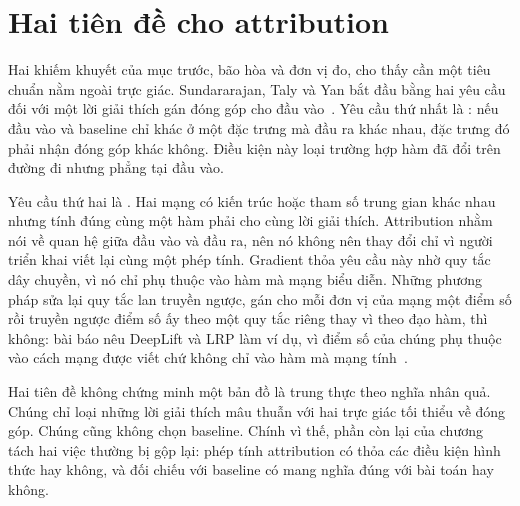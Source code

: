 \section{Hai tiên đề cho attribution}
\label{sec:ch05-hai-tien-de}

%
Hai khiếm khuyết của mục trước, bão hòa và đơn vị đo, cho thấy cần một tiêu
chuẩn nằm ngoài trực giác.
Sundararajan, Taly và Yan bắt đầu bằng hai yêu cầu đối với một lời giải thích
gán đóng góp cho đầu vào~\autocite{p11ig}. Yêu cầu thứ nhất là :
nếu đầu vào và baseline chỉ khác ở một đặc trưng mà đầu ra khác nhau, đặc trưng
đó phải nhận đóng góp khác không. Điều kiện này loại trường hợp hàm đã đổi trên
đường đi nhưng phẳng tại đầu vào.

%
Yêu cầu thứ hai là . Hai
mạng có kiến trúc hoặc tham số trung gian khác nhau nhưng tính đúng cùng một
hàm phải cho cùng lời giải thích. Attribution nhằm nói về quan hệ giữa đầu vào
và đầu ra, nên nó không nên thay đổi chỉ vì người triển khai viết lại cùng một
phép tính. Gradient thỏa yêu cầu này nhờ quy tắc dây chuyền, vì nó chỉ phụ thuộc vào hàm
mà mạng biểu diễn. Những phương pháp sửa lại quy tắc lan truyền ngược, gán cho
mỗi đơn vị của mạng một điểm số rồi truyền ngược điểm số ấy theo một quy tắc
riêng thay vì theo đạo hàm, thì không: bài báo nêu DeepLift và LRP làm ví dụ,
vì điểm số của chúng phụ thuộc vào cách mạng được viết chứ không chỉ vào hàm
mà mạng tính~\autocite{p11ig}.

Hai tiên đề không chứng minh một bản đồ là trung thực theo nghĩa nhân quả. Chúng
chỉ loại những lời giải thích mâu thuẫn với hai trực giác tối thiểu về đóng góp.
Chúng cũng không chọn baseline. Chính vì thế, phần còn lại của chương tách hai
việc thường bị gộp lại: phép tính attribution có thỏa các điều kiện hình thức
hay không, và đối chiếu với baseline có mang nghĩa đúng với bài toán hay không.

